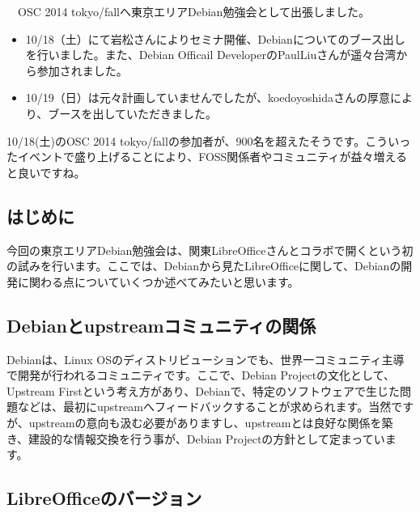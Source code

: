 \documentclass[mingoth,a4paper]{jsarticle}
\begin{document}
　OSC 2014 tokyo/fallへ東京エリアDebian勉強会として出張しました。 

\begin{itemize}
\item 10/18（土）にて岩松さんによりセミナ開催、Debianについてのブース出しを行いました。また、Debian Officail DeveloperのPaulLiuさんが遥々台湾から参加されました。
\item 10/19（日）は元々計画していませんでしたが、koedoyoshidaさんの厚意により、ブースを出していただきました。
\end{itemize} 
 
 10/18(土)のOSC 2014 tokyo/fallの参加者が、900名を超えたそうです。こういったイベントで盛り上げることにより、FOSS関係者やコミュニティが益々増えると良いですね。




\subsection{はじめに}

 今回の東京エリアDebian勉強会は、関東LibreOfficeさんとコラボで開くという初の試みを行います。ここでは、Debianから見たLibreOfficeに関して、Debianの開発に関わる点についていくつか述べてみたいと思います。

\subsection{Debianとupstreamコミュニティの関係}

 Debianは、Linux OSのディストリビューションでも、世界一コミュニティ主導で開発が行われるコミュニティです。ここで、Debian Projectの文化として、Upstream Firstという考え方があり、Debianで、特定のソフトウェアで生じた問題などは、最初にupstreamへフィードバックすることが求められます。当然ですが、upstreamの意向も汲む必要がありますし、upstreamとは良好な関係を築き、建設的な情報交換を行う事が、Debian Projectの方針として定まっています。

\subsection{LibreOfficeのバージョン}
\end{document}
